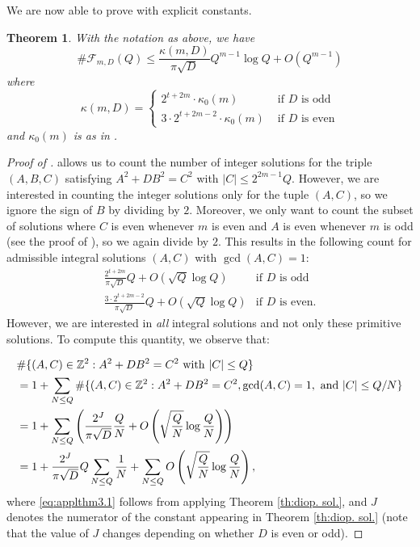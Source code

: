 \documentclass[12pt]{amsart}
\theoremstyle{plain}
\newtheorem{theorem}{Theorem}[section]
\begin{document}
We are now able to prove  with explicit constants.

\begin{theorem}\label{th:Count with constants}
With the notation as above, we have    
     \[
    \# \mathcal{F}_{m,D}(Q) \leq \frac{\kappa(m,D)}{\pi\sqrt{D}}Q^{m-1}\log Q + O(Q^{m-1})
    \]
    where 
    \[ \kappa(m,D)=
    \begin{cases}
        2^{t+2m}\cdot\kappa_0(m) & \text{ if $D$ is odd} \\
        3\cdot2^{t+2m-2}\cdot\kappa_0(m) & \text{ if $D$ is even}
    \end{cases} 
    \]
    and $\kappa_0(m)$ is as in .
\end{theorem}

\begin{proof}[Proof of ]
 allows us to count the number of integer solutions for the triple $(A,B,C)$ satisfying $A^2+DB^2=C^2$ with $|C| \leq 2^{2m-1} Q$. However, we are interested in counting the integer solutions only for the tuple $(A,C)$, so we ignore the sign of $B$ by dividing by $2$. Moreover, we only want to count the subset of solutions where $C$ is even whenever $m$ is even and $A$ is even whenever $m$ is odd (see the proof of ), so we again divide by $2$. This results in the following count for admissible integral solutions $(A,C)$ with $\gcd(A,C)=1$:
\begin{equation}\label{coefficient}
\begin{array}{ll}
    \frac{2^{t+2m}}{\pi\sqrt{D}}Q + O(\sqrt{Q}\log Q) & \text{if $D$ is odd} \\
    \frac{3\cdot2^{t+2m-2}}{\pi\sqrt{D}}Q + O(\sqrt{Q}\log Q) & \text{if $D$ is even.} 
\end{array}
\end{equation}
However, we are interested in \textit{all} integral solutions and not only these primitive solutions. To compute this quantity, we observe that:

\begin{align}&\#\{(A, C) \in \mathbb{Z}^2: A^2 + DB^2 = C^2 \ \mathrm{with} \ |C| \leq Q\} \notag \\ &= 1 + \sum_{N \leq Q}\#\{(A, C) \in \mathbb{Z}^2: A^2 + DB^2 = C^2, \gcd(A, C) = 1, \ \mathrm{and} \ |C| \leq Q/N\} \notag \\ &= 1 + \sum_{N \leq Q} \left(\frac{2^J}{\pi\sqrt{D}} \frac{Q}{N} + O\left(\sqrt{\frac{Q}{N}} \log\frac{Q}{N}\right) \right) \label{eq:applthm3.1} \\ &=1 + \frac{2^J}{\pi \sqrt{D}}Q \sum_{N \leq Q} \frac{1}{N} + \sum_{N \leq Q}O\left(\sqrt{\frac{Q}{N}}\log\frac{Q}{N}\right) \label{eq:expanded}, \end{align} where \eqref{eq:applthm3.1} follows from applying Theorem \ref{th:diop. sol.}, and $J$ denotes the numerator of the constant appearing in Theorem \ref{th:diop. sol.} (note that the value of $J$ changes depending on whether $D$ is even or odd).



\end{proof}
\end{document}
